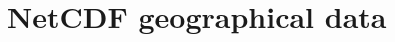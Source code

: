 \documentclass[a4paper,twoside,titlepage]{memoir}
\begin{document}
\chapter{NetCDF geographical data}

\end{document}
